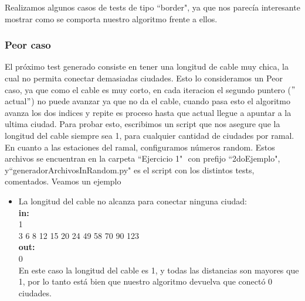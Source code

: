 Realizamos algunos casos de tests de tipo ``border", ya que nos parecía interesante mostrar como se comporta nuestro algoritmo frente a ellos.\\

\subsubsection{Peor caso}

El próximo test generado consiste en tener una longitud de cable muy chica, la cual no permita conectar demasiadas ciudades. Esto lo consideramos un Peor caso, ya que como el cable es muy corto, en cada iteracion el segundo puntero ($"$actual$"$) no puede avanzar ya que no da el cable, cuando pasa esto el algoritmo avanza los dos indices y repite es proceso hasta que actual llegue a apuntar a la ultima ciudad.  Para probar esto, escribimos un script que nos asegure que la longitud del cable siempre sea 1, para cualquier cantidad de ciudades por ramal. En cuanto a las estaciones del ramal, configuramos números random. Estos archivos se encuentran en la carpeta ``Ejercicio 1" $ $ con prefijo ``2doEjemplo", y``generadorArchivosInRandom.py" $ $es el script con los distintos tests, comentados. Veamos un ejemplo\\

\begin{itemize}
\item La longitud del cable no alcanza para conectar ninguna ciudad:\\
\textbf{in:}\\
1\\
3 6 8 12 15 20 24 49 58 70 90 123 \\
\textbf{out:}\\
0\\

En este caso la longitud del cable es 1, y todas las distancias son mayores que 1, por lo tanto está bien que nuestro algoritmo devuelva que conectó 0 ciudades.\\
\end{itemize}

